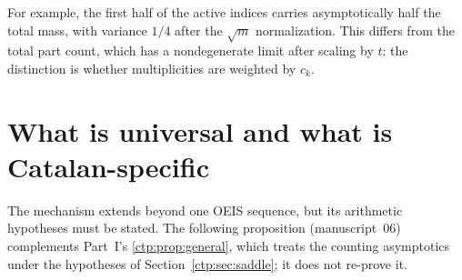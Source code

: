 \documentclass[11pt,a4paper]{article}
\numberwithin{equation}{section}
\theoremstyle{definition}
\theoremstyle{remark}
\begin{document}
For example, the first half of the active indices carries asymptotically
half the total mass, with variance $1/4$ after the $\sqrt m$ normalization.
This differs from the total part count, which has a nondegenerate limit
after scaling by $t$: the distinction is whether multiplicities are weighted
by $c_k$.

\section{What is universal and what is Catalan-specific}
\label{ctp:cl:sec:universal}

The mechanism extends beyond one OEIS sequence, but its arithmetic
hypotheses must be stated. The following proposition (manuscript~06)
complements Part~I's \cref{ctp:prop:general}, which treats the counting
asymptotics under the hypotheses of Section~\ref{ctp:sec:saddle}; it does
not re-prove it.
\end{document}
